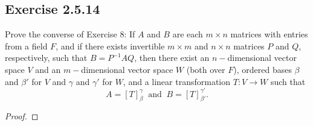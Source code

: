 \subsection*{Exercise 2.5.14} Prove the converse of Exercise 8: If \( A  \) and \( B  \) are each \( m \times n  \) matrices with entries from a field \( F \), and if there exists invertible \( m \times m  \) and \( n \times n  \) matrices \( P  \) and \( Q  \), respectively, such that \( B = P^{-1} A Q  \), then there exist an \( n- \)dimensional vector space \( V  \) and an \( m- \)dimensional vector space \( W  \) (both over \( F \)), ordered bases \( \beta \) and \( \beta'  \) for \( V  \) and \( \gamma \) and \( \gamma'  \) for \( W  \), and a linear transformation \( T: V \to W  \) such that
\[  A = [T]_{\beta}^{\gamma}  \ \text{ and } \ B = [T]_{\beta'}^{\gamma'}. \]
\begin{proof}

\end{proof}

